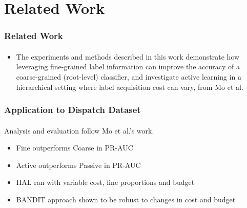 \documentclass{beamer}
\begin{document}
\section{Related Work}
\begin{frame}
    \frametitle{Related Work}
    \framesubtitle{}
    \begin{itemize}
      \item The experiments and methods described in this work
demonstrate how leveraging fine-grained label  information
can improve the accuracy of a coarse-grained (root-level) classifier, and
 investigate active learning in a hierarchical setting where
 label acquisition cost can vary, from Mo et al.
    \end{itemize}
\end{frame}
\begin{frame}
    \frametitle{Application to Dispatch Dataset}
    \framesubtitle{}
    \par Analysis and evaluation follow Mo et al.'s work.
    \begin{itemize}
      \item Fine outperforms Coarse in PR-AUC
      \item Active outperforms Passive in PR-AUC
      \item HAL ran with variable cost, fine proportions and budget
      \item BANDIT approach shown to be robust to changes in cost and budget
    \end{itemize}
\end{frame}
\end{document}
